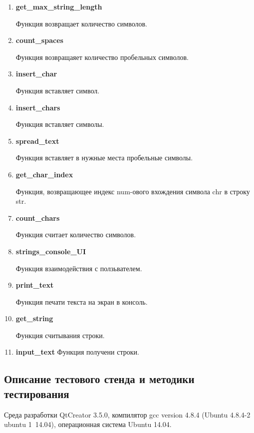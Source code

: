 \documentclass[12pt,a4paper]{report}
\begin{document}
\begin{enumerate}

		\item \textbf{get\_max\_string\_length}
	
	Функция возвращает количество символов.
	
		\item \textbf{count\_spaces}
		
	Функция возвращаяет количество пробельных символов.
		
		\item \textbf{insert\_char}
	
	Функция вставляет символ.	
	
		\item \textbf{insert\_chars}
		
	Функция вставляет символы.
		
		\item \textbf{spread\_text}
	
	Функция вставляет в нужные места пробельные символы.	
	
		\item \textbf{get\_char\_index}
		
	Функция, возвращающее индекс num-ового вхождения символа chr в строку str.
	
		\item \textbf{count\_chars}
		
	Функция считает количество символов.
	
		\item \textbf{strings\_console\_UI}
		
	Функция взаимодействия с ползьвателем.		
	
		\item \textbf{print\_text}
	
	Функция печати текста на экран в консоль.	
	
		\item \textbf{get\_string}
	
	Функция считывания строки.	
	
		\item \textbf{input\_text}
	Функция получени строки.
\end{enumerate}
\subsection{Описание тестового стенда и методики тестирования}
\hspace{\parindent}
Среда разработки QtCreator 3.5.0, компилятор gcc version 4.8.4 (Ubuntu 4.8.4-2 ubuntu 1~14.04), операционная система Ubuntu 14.04. 
\end{document}
